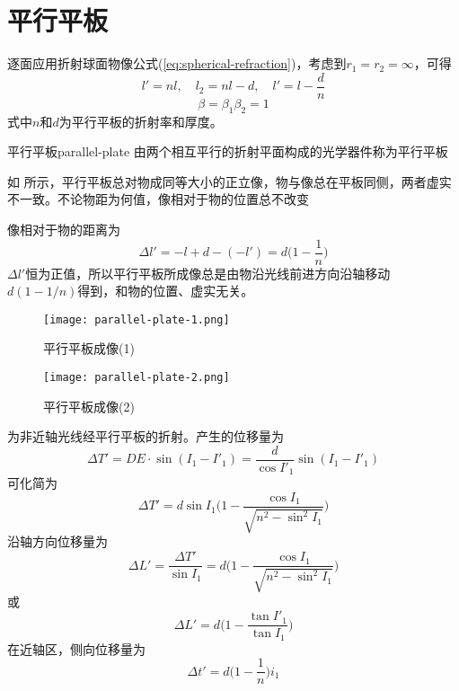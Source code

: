 \documentclass[cn,10pt,chinesefont=founder,math=newtx,cite=super,twoside]{elegantbook}
\begin{document}
\section{平行平板}
\label{sect:parallel-plate}

逐面应用折射球面物像公式(\ref{eq:spherical-refraction})，考虑到$r_1=r_2=\infty$，可得
\begin{equation}
l'=nl,\quad l_2=nl-d,\quad l'=l-\frac{d}{n}
\end{equation}
\begin{equation}
\beta=\beta_1\beta_2=1
\end{equation}
式中$n$和$d$为平行平板的折射率和厚度。

\begin{definition}{平行平板}{parallel-plate}
	由两个相互平行的折射平面构成的光学器件称为平行平板
\end{definition}

\begin{property}
如 所示，平行平板总对物成同等大小的正立像，物与像总在平板同侧，两者虚实不一致。不论物距为何值，像相对于物的位置总不改变
\end{property}

像相对于物的距离为
\begin{equation}
\Delta l'=-l+d-(-l')=d\bigg(1-\frac{1}{n}\bigg)
\end{equation}
$\Delta l'$恒为正值，所以平行平板所成像总是由物沿光线前进方向沿轴移动$d(1-1/n)$得到，和物的位置、虚实无关。

\begin{figure}[htbp]
	\centering
	\begin{minipage}[t]{0.48\textwidth}
		\centering
		\texttt{[image: parallel-plate-1.png]}
		\caption{平行平板成像(1)}
		\label{fig:parallel-plate-1}
	\end{minipage}
	\qquad
	\begin{minipage}[t]{0.45\textwidth}
		\centering
		\texttt{[image: parallel-plate-2.png]}
		\caption{平行平板成像(2)}
		\label{fig:parallel-plate-2}
	\end{minipage}
\end{figure}

 为非近轴光线经平行平板的折射。产生的位移量为
\begin{equation}
\Delta T'=DE\cdot\sin(I_1-I'_1)=\frac{d}{\cos{I'_1}}\sin(I_1-I'_1)
\end{equation}
可化简为
\begin{equation}
\Delta T'=d\sin I_1\bigg(1-\frac{\cos I_1}{\sqrt{n^2-\sin^2 I_1}}\bigg)
\end{equation}
沿轴方向位移量为
\begin{equation}
\Delta L'=\frac{\Delta T'}{\sin I_1}=d\bigg(1-\frac{\cos I_1}{\sqrt{n^2-\sin^2 I_1}}\bigg)
\end{equation}
或
\begin{equation}
\Delta L'=d\bigg(1-\frac{\tan I'_1}{\tan I_1}\bigg)
\end{equation}
在近轴区，侧向位移量为
\begin{equation}
\Delta t'=d\bigg(1-\frac{1}{n}\bigg)i_1
\end{equation}
\end{document}
